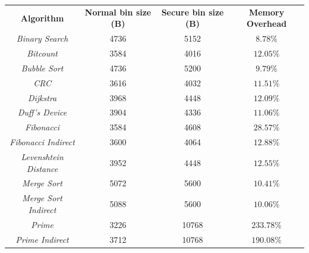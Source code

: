 \begin{table}
  \centering
  \begin{tabular}{|c|c|c|c|}
    \hline
    \textbf{Algorithm}                   & \textbf{Normal bin size (B)} & \textbf{Secure bin size (B)} & \textbf{Memory Overhead} \\
    \hhline{====} \textit{Binary Search} & 4736                         & 5152                         & $8.78\%$                 \\
    \hline
    \textit{Bitcount}                    & 3584                         & 4016                         & $12.05\%$                \\
    \hline
    \textit{Bubble Sort}                 & 4736                         & 5200                         & $9.79\%$                 \\
    \hline
    \textit{CRC}                         & 3616                         & 4032                         & $11.51\%$                \\
    \hline
    \textit{Dijkstra}                    & 3968                         & 4448                         & $12.09\%$                \\
    \hline
    \textit{Duff's Device}               & 3904                         & 4336                         & $11.06\%$                \\
    \hline
    \textit{Fibonacci}                   & 3584                         & 4608                         & $28.57\%$                \\
    \hline
    \textit{Fibonacci Indirect}          & 3600                         & 4064                         & $12.88\%$                \\
    \hline
    \textit{Levenshtein Distance}        & 3952                         & 4448                         & $12.55\%$                \\
    \hline
    \textit{Merge Sort}                  & 5072                         & 5600                         & $10.41\%$                \\
    \hline
    \textit{Merge Sort Indirect}         & 5088                         & 5600                         & $10.06\%$                \\
    \hline
    \textit{Prime}                       & 3226                         & 10768                        & $233.78\%$               \\
    \hline
    \textit{Prime Indirect}              & 3712                         & 10768                        & $190.08\%$               \\

\end{tabular}
\end{table}
